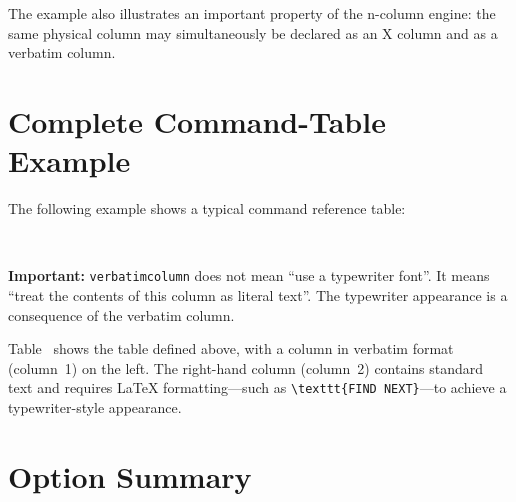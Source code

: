 \documentclass[
11pt,
a4paper,
oneside
]{scrbook}
\begin{document}


The example also illustrates an important property of the n-column engine:
the same physical column may simultaneously be declared as an X column and
as a verbatim column.


\section{Complete Command-Table Example}

The following example shows a typical command reference table:

\begin{SynchronizedMarginAndTextArea}
	\begin{TextInMarginArea}
		{\centering\mdSeeRight\\[1ex]}
		
		\textbf{Important:}
		\texttt{verbatimcolumn} does not mean ``use a typewriter font''.
		It means ``treat the contents of this column as literal text''.
		The typewriter appearance is a consequence of the verbatim column.
	\end{TextInMarginArea}




\end{SynchronizedMarginAndTextArea}





Table~ shows the table defined above, with a
column in verbatim format (column~1) on the left. The right-hand column
(column~2) contains standard text and requires \LaTeX{} formatting---such as
\verb|\texttt{FIND NEXT}|---to achieve a typewriter-style appearance.



\section{Option Summary}

%
\end{document}
